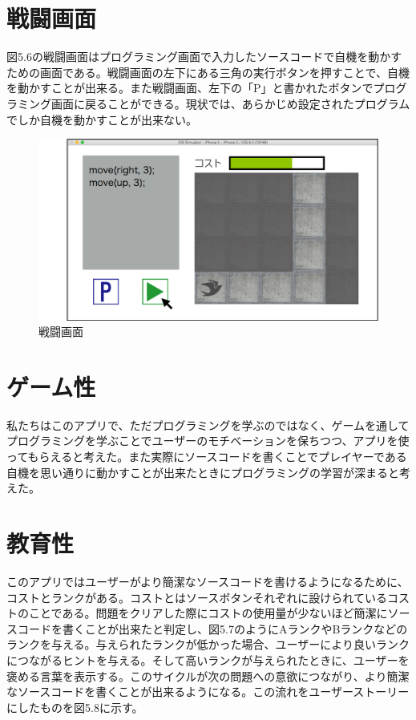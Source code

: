 \documentclass[openany,11pt,papersize]{jsbook}
\begin{document}

\section{戦闘画面}
図5.6の戦闘画面はプログラミング画面で入力したソースコードで自機を動かすための画面である。戦闘画面の左下にある三角の実行ボタンを押すことで、自機を動かすことが出来る。また戦闘画面、左下の「P」と書かれたボタンでプログラミング画面に戻ることができる。現状では、あらかじめ設定されたプログラムでしか自機を動かすことが出来ない。

\begin{figure}[H]
\begin{center}
\includegraphics[width=12cm, bb=0 0 1136 662]{img/5thParagraph/Prog-ra_Battle.png}
\end{center}
\caption{戦闘画面}
\end{figure}


\section{ゲーム性}
私たちはこのアプリで、ただプログラミングを学ぶのではなく、ゲームを通してプログラミングを学ぶことでユーザーのモチベーションを保ちつつ、アプリを使ってもらえると考えた。また実際にソースコードを書くことでプレイヤーである自機を思い通りに動かすことが出来たときにプログラミングの学習が深まると考えた。
 


\section{教育性}
このアプリではユーザーがより簡潔なソースコードを書けるようになるために、コストとランクがある。コストとはソースボタンそれぞれに設けられているコストのことである。問題をクリアした際にコストの使用量が少ないほど簡潔にソースコードを書くことが出来たと判定し、図5.7のようにAランクやBランクなどのランクを与える。与えられたランクが低かった場合、ユーザーにより良いランクにつながるヒントを与える。そして高いランクが与えられたときに、ユーザーを褒める言葉を表示する。このサイクルが次の問題への意欲につながり、より簡潔なソースコードを書くことが出来るようになる。この流れをユーザーストーリーにしたものを図5.8に示す。
\end{document}
